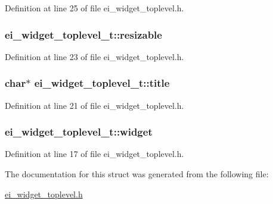 Definition at line 25 of file ei\-\_\-widget\-\_\-toplevel.\-h.

\hypertarget{structei__widget__toplevel__t_a2959bf91c46bfbf8772cd7974168fd1b}{
\subsubsection[{resizable}]{ ei\-\_\-widget\-\_\-toplevel\-\_\-t\-::resizable}}\label{structei__widget__toplevel__t_a2959bf91c46bfbf8772cd7974168fd1b}


Definition at line 23 of file ei\-\_\-widget\-\_\-toplevel.\-h.

\hypertarget{structei__widget__toplevel__t_a2dba56e4fa0df714a546e4175fe3563e}{
\subsubsection[{title}]{\setlength{\rightskip}{0pt plus 5cm}char$\ast$ ei\-\_\-widget\-\_\-toplevel\-\_\-t\-::title}}\label{structei__widget__toplevel__t_a2dba56e4fa0df714a546e4175fe3563e}


Definition at line 21 of file ei\-\_\-widget\-\_\-toplevel.\-h.

\hypertarget{structei__widget__toplevel__t_a3babaea121cf413ae2020cea768479b0}{
\subsubsection[{widget}]{ ei\-\_\-widget\-\_\-toplevel\-\_\-t\-::widget}}\label{structei__widget__toplevel__t_a3babaea121cf413ae2020cea768479b0}


Definition at line 17 of file ei\-\_\-widget\-\_\-toplevel.\-h.



The documentation for this struct was generated from the following file\-:\begin{DoxyCompactItemize}
\item 
\hyperlink{ei__widget__toplevel_8h}{ei\-\_\-widget\-\_\-toplevel.\-h}\end{DoxyCompactItemize}
